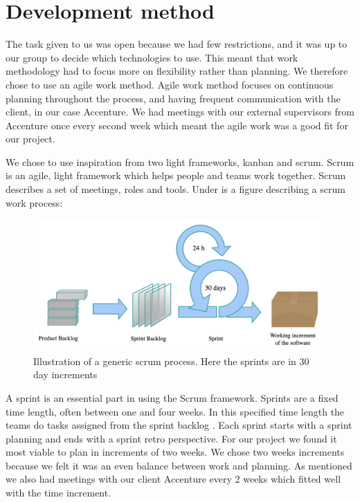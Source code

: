 \section{Development method}
The task given to us was open because we had few restrictions, and it was up to our group to decide which technologies to use. This meant that work methodology had to focus more on flexibility rather than planning. We therefore chose to use an agile work method. Agile work method focuses on continuous planning throughout the process, and having frequent communication with the client, in our case Accenture. We had meetings with our external supervisors from Accenture once every second week which meant the agile work was a good fit for our project. 

We chose to use inspiration from two light frameworks, kanban and scrum. Scrum is an agile,  light framework which helps people and teams work together. Scrum describes a set of meetings, roles and tools. Under is a figure describing a scrum work process:

\begin{figure}[h!]
	\centering
	\includegraphics[width=1\linewidth]{figures/scrum_process}
	\caption[scrum process]{Illustration of a generic scrum process. Here the sprints are in 30 day increments}
	\label{fig:scrumprocess}
\end{figure}


A sprint is an essential part in using the Scrum framework. Sprints are a fixed time length, often between one and four weeks. In this specified time length the teams do tasks assigned from the sprint backlog . Each sprint starts with a sprint planning and ends with a sprint retro perspective. For our project we found it most viable to plan in increments of two weeks. We chose two weeks increments because we felt it was an even balance between work and planning. As mentioned we also had meetings with our client Accenture every 2 weeks which fitted well with the time increment.  

